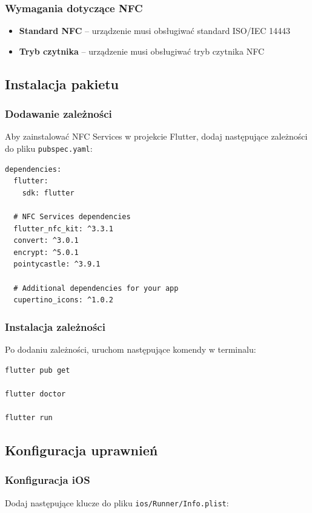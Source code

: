 \documentclass[a4paper,12pt]{article}
\begin{document}
\subsubsection{Wymagania dotyczące NFC}
\begin{itemize}
    \item \textbf{Standard NFC} -- urządzenie musi obsługiwać standard ISO/IEC 14443
    \item \textbf{Tryb czytnika} -- urządzenie musi obsługiwać tryb czytnika NFC
\end{itemize}

\subsection{Instalacja pakietu}

\subsubsection{Dodawanie zależności}
Aby zainstalować NFC Services w projekcie Flutter, dodaj następujące zależności do pliku \texttt{pubspec.yaml}:

\begin{lstlisting}
dependencies:
  flutter:
    sdk: flutter
  
  # NFC Services dependencies
  flutter_nfc_kit: ^3.3.1
  convert: ^3.0.1
  encrypt: ^5.0.1
  pointycastle: ^3.9.1
  
  # Additional dependencies for your app
  cupertino_icons: ^1.0.2
\end{lstlisting}

\subsubsection{Instalacja zależności}
Po dodaniu zależności, uruchom następujące komendy w terminalu:

\begin{lstlisting}[language=bash]
flutter pub get

flutter doctor

flutter run
\end{lstlisting}

\subsection{Konfiguracja uprawnień}

\subsubsection{Konfiguracja iOS}
Dodaj następujące klucze do pliku \texttt{ios/Runner/Info.plist}:
\end{document}
